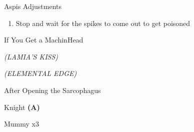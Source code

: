 \begin{paracol}{2}
\switchcolumn
\begin{steproute}{Aspis Adjustments}
\end{steproute}

\switchcolumn
\begin{enumerate}[resume]
    \item Stop and wait for the spikes to come out to get poisoned
\end{enumerate}

\switchcolumn
\begin{misc}{If You Get a MachinHead}
    \begin{notes}
        \item {}
    \end{notes}
    \begin{round}{1}
        \bartz \rightCommand{\combine} \then \battleGroup{\maidensKiss \space + \eyedrop} \textit{(LAMIA'S KISS)} \then {}
        \cara \leftCommand{\throw} \then \thunderScroll 
        \faris \leftCommand{\throw} \then \thunderScroll 
    \end{round}
    \begin{round}{2}
        \bartz \rightCommand{\combine} \then \battleGroup{\eyedrop \space + \revivify} \textit{(ELEMENTAL EDGE)} \then {}
        \cara \leftCommand{\throw} \then \thunderScroll 
        \faris \leftCommand{\throw} \then \thunderScroll 
    \end{round}
\end{misc}

\switchcolumn
\begin{menu}{After Opening the Sarcophagus}
    \varwb
    \begin{jobMenu}
        \bartz Knight \textbf{(A)} \ability{!\black} \optimize
    \end{jobMenu}
    \begin{itemMenu}
        \hiPotionMenu {}
    \end{itemMenu}
    \varwe
\end{menu}

\begin{boss}{Mummy x3}
    \varwb
    \begin{round}{1}
        \cara \leftCommand{\throw} \then \flameScroll
        \faris \leftCommand{\throw} \then \flameScroll
        \bartz \rightCommand{\black} \then \fire
    \end{round}
    \varwe
\end{boss}


\end{paracol}
